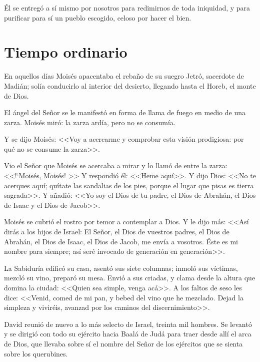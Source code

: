 Él se entregó a sí 
mismo por nosotros para redimirnos de toda 
iniquidad, y para purificar para sí un pueblo 
escogido, celoso por hacer el bien. 

\newpage
\section{Tiempo ordinario}


 En aquellos días Moisés apacentaba el rebaño 
de su suegro Jetró, sacerdote de Madián; solía 
conducirlo al interior del desierto, llegando 
hasta el Horeb, el monte de Dios. 

El ángel del 
Señor se le manifestó en forma de llama de 
fuego en medio de una zarza. Moisés miró: la 
zarza ardía, pero no se consumía. 

Y se dijo 
Moisés: <<Voy a acercarme y comprobar esta 
visión prodigiosa: por qué no se consume la 
zarza>>. 

Vio el Señor que Moisés se acercaba a 
mirar y lo llamó de entre la zarza: <<!`Moisés, 
Moisés! >> Y respondió él: <<Heme aquí>>. Y dijo 
Dios: <<No te acerques aquí; quítate las 
sandalias de los pies, porque el lugar que pisas 
es tierra sagrada>>. Y añadió: <<Yo soy el Dios 
de tu padre, el Dios de Abrahán, el Dios de 
Isaac y el Dios de Jacob>>. 

Moisés se cubrió el 
rostro por temor a contemplar a Dios. Y le dijo 
más: <<Así dirás a los hijos de Israel: El Señor, 
el Dios de vuestros padres, el Dios de 
Abrahán, el Dios de Isaac, el Dios de Jacob, me 
envía a vosotros. Éste es mi nombre para 
siempre; así seré invocado de generación en 
generación>>. 


 La Sabiduría edificó su casa, asentó sus siete 
columnas; inmoló sus víctimas, mezcló su 
vino, preparó su mesa. Envió a sus criadas, y 
clama desde la altura que domina la ciudad: 
<<Quien sea simple, venga acá>>. A los faltos de 
seso les dice: <<Venid, comed de mi pan, y 
bebed del vino que he mezclado. Dejad la 
simpleza y viviréis, avanzad por los caminos 
del discernimiento>>. 


 David reunió de nuevo a lo más selecto de 
Israel, treinta mil hombres. Se levantó y se 
dirigió con todo su ejército hacia Baalá de Judá 
para traer desde allí el arca de Dios, que 
llevaba sobre sí el nombre del Señor de los 
ejércitos que se sienta sobre los querubines. 

